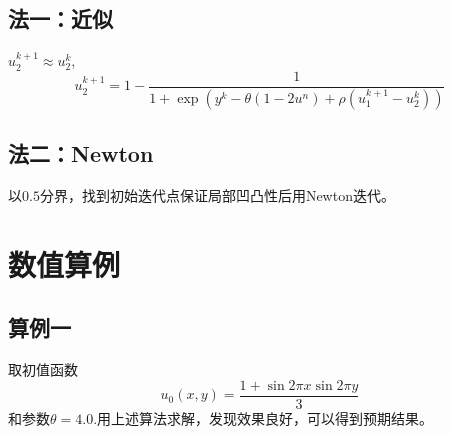 \documentclass[11pt,a4 paper,one side]{article}
\begin{document}
\subsection{法一：近似}
$u_2^{k+1} \approx u_2^k$,\begin{equation}
    u_2^{k+1} = 1 - \frac{1}{1+\exp{ (y^k-\theta (1-2u^n)+\rho (u_1^{k+1}-u_2^k))}}
\end{equation}
\subsection{法二：Newton}
以$0.5$分界，找到初始迭代点保证局部凹凸性后用Newton迭代。
\section{数值算例}
\subsection{算例一}取初值函数\begin{equation}
u_0(x,y)=\frac{1+\sin{2\pi x}\sin {2\pi y}}{3}
\end{equation}
和参数$\theta = 4.0$.用上述算法求解，发现效果良好，可以得到预期结果。
\end{document}
